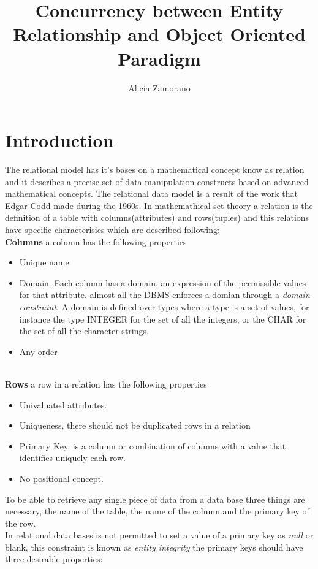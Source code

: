 \documentclass[11pt]{article}
\begin{document}
\title{Concurrency between Entity Relationship and Object Oriented Paradigm}
\author{Alicia Zamorano}
\maketitle
\section{Introduction}

The relational model has it's bases on a mathematical concept know as relation and it
describes a precise set of data manipulation constructs based on advanced mathematical
concepts.\cite{data_base_sys}
The relational data model is a result of the work that Edgar Codd made during the 1960s\cite{relational_db_design_and_impl}.
In mathemathical set theory a relation is the definition of a table with columns(attributes) and rows(tuples) and this relations have specific
characterisics which are described following:\\
\textbf{Columns} a column has the following properties
\begin{itemize}
	\item Unique name
	\item Domain. Each column has a domain, an expression of  the permissible values for that attribute.
	      almost all the DBMS enforces a domian through a \textit{domain constraint}. A domain is defined over types
	      where a type is a set of values, for instance the type INTEGER
	      for the set of all the integers, or the CHAR for the set of all the character strings.
	\item Any order
\end{itemize}\\
\textbf{Rows} a row in a relation has the following properties
\begin{itemize}
	\item Univaluated attributes.
	\item Uniqueness, there should not be duplicated rows in a relation
	\item Primary Key, is a column or combination of columns with a value that identifies uniquely each row.
	\item No positional concept.
\end{itemize}
To be able to retrieve any single piece of data from a data base three things are necessary, the name of the table, the name
of the column and the primary key of the row.\\ In relational data bases is not permitted to set a value of a primary key as \textit{null}
or blank, this constraint is known as \textit{entity integrity} the primary keys should have three desirable properties:
\end{document}
